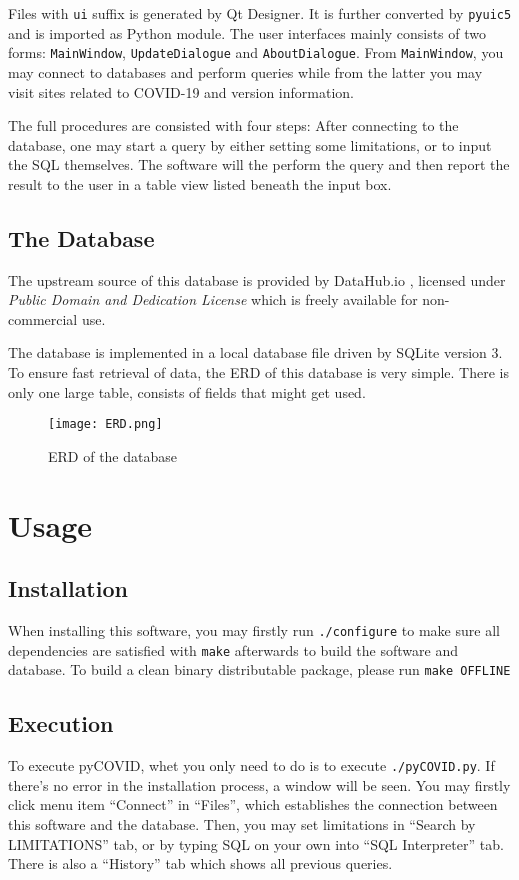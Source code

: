 \documentclass[]{ylarticle}
\begin{document}
Files with \verb|ui| suffix is generated by Qt Designer. It is further converted by \verb|pyuic5| and is imported as Python module. The user interfaces mainly consists of two forms: \verb|MainWindow|, \verb|UpdateDialogue| and \verb|AboutDialogue|. From \verb|MainWindow|, you may connect to databases and perform queries while from the latter you may visit sites related to COVID-19 and version information.

The full procedures are consisted with four steps: After connecting to the database, one may start a query by either setting some limitations, or to input the SQL themselves. The software will the perform the query and then report the result to the user in a table view listed beneath the input box.

\subsection{The Database}
The upstream source of this database is provided by DataHub.io \cite{covid}, licensed under \textit{Public Domain and Dedication License} which is freely available for non-commercial use.

The database is implemented in a local database file driven by SQLite version 3. To ensure fast retrieval of data, the ERD of this database is very simple. There is only one large table, consists of fields that might get used.

\begin{figure}[H]
    \texttt{[image: ERD.png]}
    \caption{ERD of the database}
\end{figure}
\section{Usage}

\subsection{Installation}
When installing this software, you may firstly run \verb|./configure| to make sure all dependencies are satisfied with \verb|make| afterwards to build the software and database. To build a clean binary distributable package, please run \verb|make OFFLINE|

\subsection{Execution}
To execute pyCOVID, whet you only need to do is to execute \verb|./pyCOVID.py|. If there's no error in the installation process, a window will be seen. You may firstly click menu item ``Connect'' in ``Files'', which establishes the connection between this software and the database. Then, you may set limitations in ``Search by LIMITATIONS'' tab, or by typing SQL on your own into ``SQL Interpreter'' tab. There is also a ``History'' tab which shows all previous queries.
\end{document}
